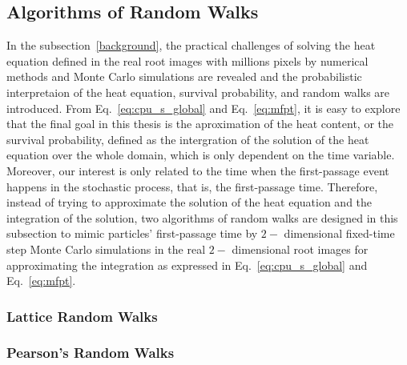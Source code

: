 \subsection{Algorithms of Random Walks}

In the subsection~\ref{background}, the practical challenges of solving the heat equation defined in the real root images with millions pixels by numerical methods and Monte Carlo simulations are revealed and the probabilistic interpretaion of the heat equation, survival probability, and random walks are introduced. From Eq.~\ref{eq:cpu_s_global} and Eq.~\ref{eq:mfpt}, it is easy to explore that the final goal in this thesis is the aproximation of the heat content, or the survival probability, defined as the intergration of the solution of the heat equation over the whole domain, which is only dependent on the time variable. Moreover, our interest is only related to the time when the first-passage event happens in the stochastic process, that is, the first-passage time. Therefore, instead of trying to approximate the solution of the heat equation and the integration of the solution, two algorithms of random walks are designed in this subsection to mimic particles' first-passage time by $2-$ dimensional fixed-time step Monte Carlo simulations in the real $2-$ dimensional root images for approximating the integration as expressed in Eq.~\ref{eq:cpu_s_global} and Eq.~\ref{eq:mfpt}.


\subsubsection{Lattice Random Walks}




\subsubsection{Pearson's Random Walks}
